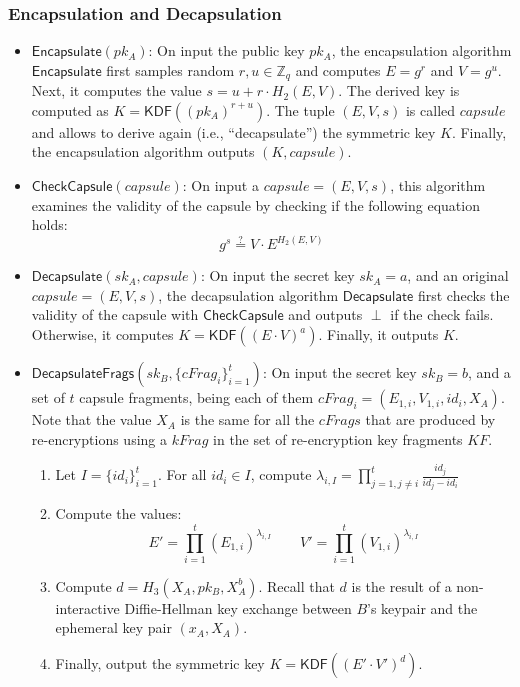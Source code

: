 \documentclass{amsart}
\begin{document}
\subsubsection{Encapsulation and Decapsulation}

\begin{itemize}
	\item $\mathsf{Encapsulate}(pk_A)$: On input the public key $pk_A$, the encapsulation algorithm $\mathsf{Encapsulate}$ first samples random $r, u \in \mathbb Z_q$ and computes $E = g^r$ and $V = g^u$. 
	Next, it computes the value $s = u + r \cdot H_2(E, V)$. 
	The derived key is computed as $K = \mathsf{KDF}((pk_A)^{r + u})$. 
	The tuple $(E, V, s)$ is called $capsule$ and allows to derive again (i.e., ``decapsulate'') the symmetric key $K$. 
	Finally, the encapsulation algorithm outputs $(K, capsule)$.	
	
	\item $\mathsf{CheckCapsule}(capsule)$: On input a $capsule = (E, V, s)$, this algorithm examines the validity of the capsule by checking if the following equation holds:
	$$ g^s \stackrel{?}{=} V \cdot E^{H_2(E, V)}$$
	
	\item $\mathsf{Decapsulate}(sk_A, capsule)$: On input the secret key $sk_A = a$, and an original $capsule = (E,V,s)$, the decapsulation algorithm $\mathsf{Decapsulate}$ first checks the validity of the capsule with $\mathsf{CheckCapsule}$ and outputs $\perp$ if the check fails. Otherwise, it computes $K = \mathsf{KDF}((E\cdot V)^{a})$. Finally, it outputs $K$.
	
	\item $\mathsf{DecapsulateFrags}(sk_B, \{cFrag_i\}_{i=1}^t)$: On input the secret key $sk_B = b$, and a set of $t$ capsule fragments, being each of them $cFrag_i = (E_{1,i}, V_{1,i}, id_i, X_A)$. Note that the value $X_A$ is the same for all the $cFrags$ that are produced by re-encryptions using a $kFrag$ in the set of re-encryption key fragments $KF$. 
	
	\begin{enumerate}
    \item Let $I = \{id_i\}_{i=1}^t$. For all $id_i\in I$, compute $\lambda_{i, I} = \prod\limits_{j=1, j\neq i}^{t} \frac{id_j}{id_j-id_i}$
    \item Compute the values:
     	$$E' = \prod\limits_{i=1}^{t} (E_{1,i})^{\lambda_{i, I}}	
		\qquad
		V' = \prod\limits_{i=1}^{t} (V_{1,i})^{\lambda_{i, I}}$$
	\item Compute $d = H_3(X_A, pk_B, X_A^b)$. Recall that $d$ is the result of a non-interactive Diffie-Hellman key exchange between $B$'s keypair and the ephemeral key pair $(x_A, X_A)$. 
	\item Finally, output the symmetric key $K= \mathsf{KDF}((E'\cdot V')^{d})$. 
	\end{enumerate}
\end{itemize}
\end{document}
